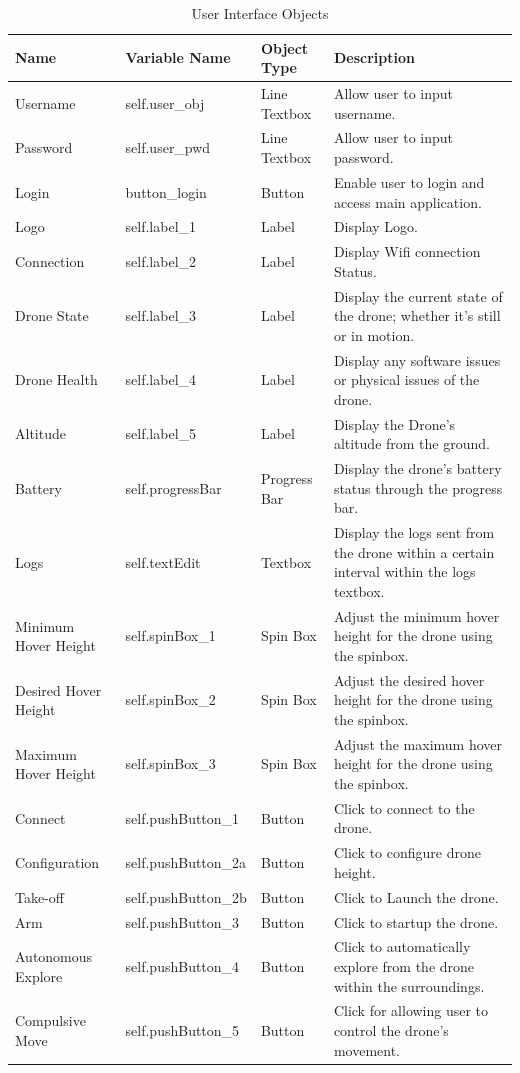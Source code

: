 \documentclass[12pt, titlepage]{article}
\begin{document}
\begin{table}[!h]
\begin{center}
\caption {User Interface Objects}
\label{tab:UserInterfaceObjects}
\begin{tabular}{ | m{2.5cm} | m{3.5cm} | m{2.5cm} | m{6.5cm} | } 
\hline
Name & Variable Name & Object Type & Description \\
\hline
Username & self.user_obj &  Line Textbox & Allow user to input username. \\
\hline
Password & self.user_pwd & Line Textbox & Allow user to input password. \\
\hline
Login & button_login & Button & Enable user to login and access main application. \\
\hline
Logo & self.label_1 & Label & Display Logo. \\
\hline
Connection & self.label_2 & Label & Display Wifi connection Status. \\
\hline
Drone State & self.label_3 & Label & Display the current state of the drone; whether it’s still or in motion. \\
\hline
Drone Health & self.label_4 & Label & Display any software issues or physical issues of the drone. \\
\hline
Altitude & self.label_5 & Label & Display the Drone’s altitude from the ground. \\
\hline
Battery & self.progressBar & Progress Bar & Display the drone's battery status through the progress bar. \\
\hline
Logs & self.textEdit & Textbox & Display the logs sent from the drone within a certain interval within the logs textbox. \\
\hline
Minimum Hover Height & self.spinBox_1 & Spin Box & Adjust the minimum hover height for the drone using the spinbox. \\
\hline
Desired Hover Height & self.spinBox_2 & Spin Box & Adjust the desired hover height for the drone using the spinbox. \\
\hline
Maximum Hover Height & self.spinBox_3 & Spin Box & Adjust the maximum hover height for the drone using the spinbox. \\
\hline
Connect & self.pushButton_1 & Button & Click to connect to the drone. \\
\hline
Configuration & self.pushButton_2a & Button & Click to configure drone height. \\
\hline
Take-off & self.pushButton_2b & Button & Click to Launch the drone. \\
\hline
Arm & self.pushButton_3 & Button & Click to startup the drone. \\
\hline
Autonomous Explore & self.pushButton_4 & Button & Click to automatically explore from the drone within the surroundings. \\
\hline
Compulsive Move & self.pushButton_5 & Button & Click for allowing user to control the  drone’s movement. \\
\hline
\end{tabular}
\end{center}
\end{table}
\end{document}
